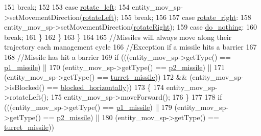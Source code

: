 \begin{DoxyCode}
151                         \textcolor{keywordflow}{break};
152 
153                     \textcolor{keywordflow}{case} \hyperlink{Structures_8h_abf3d9daa4559fb2f9e16fc1836fead1ba980501baf8209a1bfe04fa435e2cbd3e}{rotate\_left}:
154                         entity\_mov\_sp->setMovementDirection(\hyperlink{Structures_8h_a0d0b88f27f3adf9452879b5d9f829026af8f913ac2071c34908f89a0170ff0425}{rotateLeft});
155                         \textcolor{keywordflow}{break};
156 
157                     \textcolor{keywordflow}{case} \hyperlink{Structures_8h_abf3d9daa4559fb2f9e16fc1836fead1bae58291f8d743551c95d70a7129b4c544}{rotate\_right}:
158                         entity\_mov\_sp->setMovementDirection(\hyperlink{Structures_8h_a0d0b88f27f3adf9452879b5d9f829026a3b81355949ce720f9c0318b01aaf76ee}{rotateRight});
159                     \textcolor{keywordflow}{case} \hyperlink{Structures_8h_abf3d9daa4559fb2f9e16fc1836fead1ba562e0b8966ea62e894cd91a30eccfc8a}{do\_nothing}:
160                         \textcolor{keywordflow}{break};
161                 \}
162             \}
163         \}
164 
165         \textcolor{comment}{//Missiles will always move along their trajectory each management cycle}
166         \textcolor{comment}{//Exception if a missile hits a barrier}
167 
168         \textcolor{comment}{//Missile has hit a barrier}
169         \textcolor{keywordflow}{if} (((entity\_mov\_sp->getType() == \hyperlink{Structures_8h_a6d8f83e710b27d4f86c45f0bb77066e3af89bc631e9b0140ed004b5ce2db5330c}{p1\_missile}) ||
170             (entity\_mov\_sp->getType() == \hyperlink{Structures_8h_a6d8f83e710b27d4f86c45f0bb77066e3a47100170e5852d632dfe65582a18256d}{p2\_missile}) ||
171             (entity\_mov\_sp->getType() == \hyperlink{Structures_8h_a6d8f83e710b27d4f86c45f0bb77066e3a8f552a1e495ced5aa8775faa1b6a757b}{turret\_missile}))
172              && (entity\_mov\_sp->isBlocked() == \hyperlink{Structures_8h_a6fef29d9424addfa69bdd2a379424896a582e6420c60bcec29729790197d0459f}{blocked\_horizontally}))
173         \{
174             entity\_mov\_sp->rotateLeft();
175             entity\_mov\_sp->moveForward();
176         \}
177 
178          \textcolor{keywordflow}{if} (((entity\_mov\_sp->getType() == \hyperlink{Structures_8h_a6d8f83e710b27d4f86c45f0bb77066e3af89bc631e9b0140ed004b5ce2db5330c}{p1\_missile}) ||
179             (entity\_mov\_sp->getType() == \hyperlink{Structures_8h_a6d8f83e710b27d4f86c45f0bb77066e3a47100170e5852d632dfe65582a18256d}{p2\_missile}) ||
180             (entity\_mov\_sp->getType() == \hyperlink{Structures_8h_a6d8f83e710b27d4f86c45f0bb77066e3a8f552a1e495ced5aa8775faa1b6a757b}{turret\_missile}))

\end{DoxyCode}
